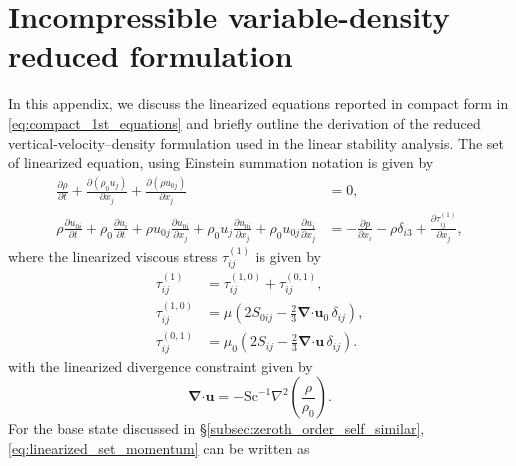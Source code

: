 \documentclass[11pt]{article}
\newcommand{\Sch}{\mathrm{Sc}}
\newcommand{\bnabla}{\boldsymbol{\nabla}}
\newcommand{\bcdot}{\boldsymbol{\cdot}}
\newenvironment{appen}{\appendix}{}
\begin{document}
\begin{appen}
\section{Incompressible variable-density reduced formulation}
\label{sec:appendix_reducedIVD}
In this appendix, we discuss the linearized equations reported in compact form in \eqref{eq:compact_1st_equations} and briefly outline the derivation of the reduced vertical-velocity--density formulation used in the linear stability analysis. The set of linearized equation, using Einstein summation notation is given by
\begin{subequations}
\begin{align}
    \frac{\partial \rho}{\partial t}
    + \frac{\partial (\rho_0 u_j)}{\partial x_j}
    + \frac{\partial (\rho u_{0j})}{\partial x_j}
    &=
    0,
    \\
    \rho \frac{\partial u_{0i}}{\partial t}
    + \rho_0 \frac{\partial u_i}{\partial t}
    + \rho u_{0j} \frac{\partial u_{0i}}{\partial x_j}
    + \rho_0 u_j \frac{\partial u_{0i}}{\partial x_j}
    + \rho_0 u_{0j} \frac{\partial u_i}{\partial x_j}
    &=
    -\frac{\partial p}{\partial x_i}
    - \rho \delta_{i3}
    + \frac{\partial \tau_{ij}^{(1)}}{\partial x_j},
    \label{eq:linearized_set_momentum}
\end{align}
\end{subequations}
where the linearized viscous stress \(\tau_{ij}^{(1)}\) is given by
\begin{subequations}
\begin{align}
    \tau_{ij}^{(1)} &= \tau_{ij}^{(1,0)} + \tau_{ij}^{(0,1)},
    \\
    \tau_{ij}^{(1,0)} &= \mu\left(2S_{0ij} - \frac{2}{3}\bnabla\bcdot\boldsymbol{u}_0\,\delta_{ij}\right),
    \\
    \tau_{ij}^{(0,1)} &= \mu_0\left(2S_{ij} - \frac{2}{3}\bnabla\bcdot\boldsymbol{u}\,\delta_{ij}\right).
\end{align}
\end{subequations}
with the linearized divergence constraint given by
\begin{equation}
    \bnabla\bcdot\boldsymbol{u}
    =
    -\Sch^{-1}\nabla^2\left(\frac{\rho}{\rho_0}\right).
\end{equation}
For the base state discussed in \S\ref{subsec:zeroth_order_self_similar}, \eqref{eq:linearized_set_momentum} can be written as
\begin{equation}\label{eq:linear_momentum_vertical_base}

\end{equation}
\end{appen}
\end{document}
